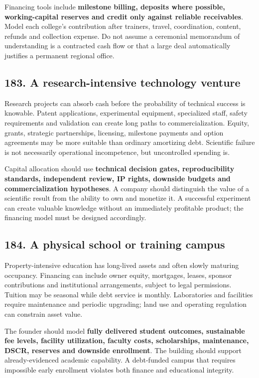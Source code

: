 Financing tools include \textbf{milestone billing, deposits where possible, working-capital reserves and credit only against reliable receivables}. Model each college's contribution after trainers, travel, coordination, content, refunds and collection expense. Do not assume a ceremonial memorandum of understanding is a contracted cash flow or that a large deal automatically justifies a permanent regional office.

\subsection{183. A research-intensive technology venture}


Research projects can absorb cash before the probability of technical success is knowable. Patent applications, experimental equipment, specialized staff, safety requirements and validation can create long paths to commercialization. Equity, grants, strategic partnerships, licensing, milestone payments and option agreements may be more suitable than ordinary amortizing debt. Scientific failure is not necessarily operational incompetence, but uncontrolled spending is.

Capital allocation should use \textbf{technical decision gates, reproducibility standards, independent review, IP rights, downside budgets and commercialization hypotheses}. A company should distinguish the value of a scientific result from the ability to own and monetize it. A successful experiment can create valuable knowledge without an immediately profitable product; the financing model must be designed accordingly.

\subsection{184. A physical school or training campus}


Property-intensive education has long-lived assets and often slowly maturing occupancy. Financing can include owner equity, mortgages, leases, sponsor contributions and institutional arrangements, subject to legal permissions. Tuition may be seasonal while debt service is monthly. Laboratories and facilities require maintenance and periodic upgrading; land use and operating regulation can constrain asset value.

The founder should model \textbf{fully delivered student outcomes, sustainable fee levels, facility utilization, faculty costs, scholarships, maintenance, DSCR, reserves and downside enrollment}. The building should support already-evidenced academic capability. A debt-funded campus that requires impossible early enrollment violates both finance and educational integrity.

